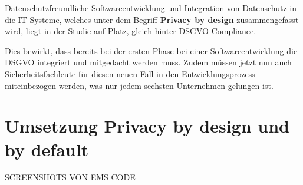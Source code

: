 Datenschutzfreundliche Softwareentwicklung und Integration von Datenschutz in die IT-Systeme, welches unter dem Begriff \textbf{Privacy by design} zusammengefasst wird, liegt in der Studie auf Platz, gleich hinter DSGVO-Compliance. 

Dies bewirkt, dass bereits bei der ersten Phase bei einer Softwareentwicklung die DSGVO integriert und mitgedacht werden muss. Zudem müssen jetzt nun auch Sicherheitsfachleute für diesen neuen Fall in den Entwicklungsprozess miteinbezogen werden, was nur jedem sechsten Unternehmen gelungen ist.

\section{Umsetzung Privacy by design und by default}

SCREENSHOTS VON EMS CODE

\newpage
